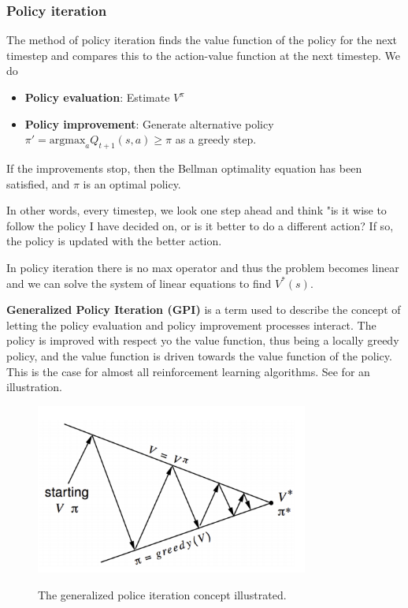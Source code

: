 \subsubsection{Policy iteration}

The method of policy iteration finds the value function of the policy for the next timestep and compares this to the action-value function at the next timestep. We do

\begin{itemize}
    \item \textbf{Policy evaluation}: Estimate $V^{\pi}$
    \item \textbf{Policy improvement}: Generate alternative policy $\pi' = \text{argmax}_a Q_{t+1}(s, a) \geq \pi$ as a greedy step.
\end{itemize}

If the improvements stop, then the Bellman optimality equation has been satisfied, and $\pi$ is an optimal policy.

In other words, every timestep, we look one step ahead and think "is it wise to follow the policy I have decided on, or is it better to do a different action? If so, the policy is updated with the better action.

In policy iteration there is no max operator and thus the problem becomes linear and we can solve the system of linear equations to find $V^*(s)$.


\textbf{Generalized Policy Iteration (GPI)} is a term used to describe the concept of letting the policy evaluation and policy improvement processes interact. The policy is improved with respect yo the value function, thus being a locally greedy policy, and the value function is driven towards the value function of the policy. This is the case for almost all reinforcement learning algorithms. See  for an illustration.

\begin{figure}[h]
    \centering
        \includegraphics[width=0.8\textwidth]{figures/solving/GPI.PNG}\\
        \caption{The generalized police iteration concept illustrated.}
        \label{fig:gpi}
\end{figure}


